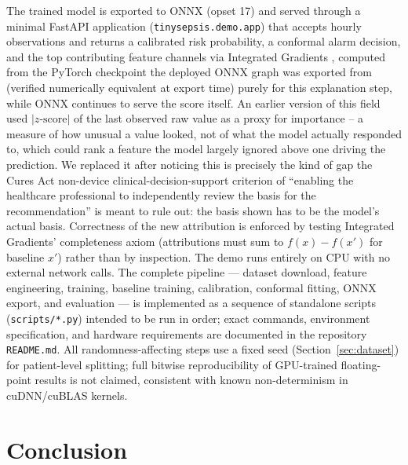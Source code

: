 \documentclass[11pt]{article}
\begin{document}
The trained model is exported to ONNX (opset 17) and served through a minimal FastAPI application (\texttt{tinysepsis.demo.app}) that accepts hourly observations and returns a calibrated risk probability, a conformal alarm decision, and the top contributing feature channels via Integrated Gradients \citep{sundararajan2017axiomatic}, computed from the PyTorch checkpoint the deployed ONNX graph was exported from (verified numerically equivalent at export time) purely for this explanation step, while ONNX continues to serve the score itself. An earlier version of this field used $|z\text{-score}|$ of the last observed raw value as a proxy for importance -- a measure of how unusual a value looked, not of what the model actually responded to, which could rank a feature the model largely ignored above one driving the prediction. We replaced it after noticing this is precisely the kind of gap the Cures Act non-device clinical-decision-support criterion of ``enabling the healthcare professional to independently review the basis for the recommendation'' is meant to rule out: the basis shown has to be the model's actual basis. Correctness of the new attribution is enforced by testing Integrated Gradients' completeness axiom (attributions must sum to $f(x)-f(x')$ for baseline $x'$) rather than by inspection. The demo runs entirely on CPU with no external network calls. The complete pipeline --- dataset download, feature engineering, training, baseline training, calibration, conformal fitting, ONNX export, and evaluation --- is implemented as a sequence of standalone scripts (\texttt{scripts/*.py}) intended to be run in order; exact commands, environment specification, and hardware requirements are documented in the repository \texttt{README.md}. All randomness-affecting steps use a fixed seed (Section~\ref{sec:dataset}) for patient-level splitting; full bitwise reproducibility of GPU-trained floating-point results is not claimed, consistent with known non-determinism in cuDNN/cuBLAS kernels.

\section{Conclusion}
\label{sec:conclusion}
\end{document}
